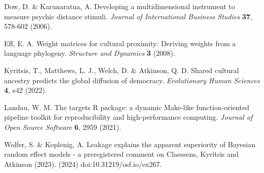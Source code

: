 Dow, D. \& Karunaratna, A. Developing a multidimensional instrument to measure 
psychic distance stimuli. \textit{Journal of International Business Studies}
\textbf{37}, 578-602 (2006).

Eff, E. A. Weight matrices for cultural proximity: Deriving weights from a 
language phylogeny. \textit{Structure and Dynamics} \textbf{3} (2008).

Kyritsis, T., Matthews, L. J., Welch, D. \& Atkinson, Q. D. Shared cultural 
ancestry predicts the global diffusion of democracy. \textit{Evolutionary Human 
Sciences} \textbf{4}, e42 (2022).

Landau, W. M. The targets R package: a dynamic Make-like function-oriented
pipeline toolkit for reproducibility and high-performance computing.
\textit{Journal of Open Source Software} \textbf{6}, 2959 (2021).

Wolfer, S. \& Koplenig, A. Leakage explains the apparent superiority of Bayesian
random effect models - a preregistered comment on Claessens, Kyritsis and 
Atkinson (2023). (2024) doi:10.31219/osf.io/ex267.
